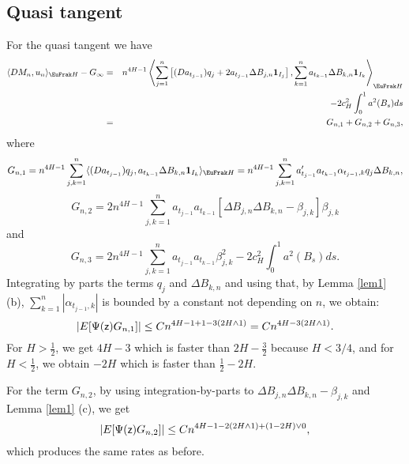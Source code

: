 \documentclass[a4paper]{article}
\newcommand{\colorb}{\color[rgb]{0,0,0.8}}
\newcommand{\colorb}{\color{black}}%
\numberwithin{equation}{section}
\newcommand{\sfz}{{\sf z}}
\def\HH{\EuFrak H}
\begin{document}
     \medskip
     \noindent
   \subsection{Quasi tangent}
     
     For the quasi tangent we have
     \begin{eqnarray*}
     \langle DM_n, u_n \rangle_{\HH} - G_\infty &=& n^{4H-1} \left  \langle    \sum_{j=1}^n  \left[( D a_{t_{j-1}}) q_j +   2  a_{t_{j-1}}  \Delta B_{j,n}   \mathbf{1}_{ I_j}  \right],
      \sum_{k=1}^n  a_{t_{k-1}} \Delta  B_{k,n}   \mathbf{1}_{ I_k}  \right  \rangle_{\HH}\\
      &&-  2c_H^2 \int_0^1 a^2 (B_s) ds\\
      &=& G_{n,1} + G_{n,2} + G_{n,3},
     \end{eqnarray*}
     where
     \[
     G_{n,1}= n^{4H-1}  \sum_{j,k=1}^n\langle   (D a_{t_{j-1}}) q_j , a_{t_{k-1}} \Delta  B_{k,n}   \mathbf{1}_{ I_k} \rangle_{\HH}
     =n^{4H-1}  \sum_{j,k=1}^n a'_{t_{j-1}}  a_{t_{k-1}} \alpha_{t_{j-1},k} q_j  \Delta  B_{k,n} ,
     \]
     \[
     G_{n,2}= 2n^{4H-1}  \sum_{j,k=1}^n  a_{t_{j-1}} a_{t_{k-1}} [\Delta B_{j,n}\Delta  B_{k,n}  -\beta_{j,k}] \beta_{j,k}
     \]
     and
     \[
      G_{n,3}= 2n^{4H-1}  \sum_{j,k=1}^n  a_{t_{j-1}} a_{t_{k-1}} \beta_{j,k}^2-2c_H^2 \int_0^1 a^2 (B_s) ds.
      \]
     Integrating by parts the terms $q_j$ and $ \Delta  B_{k,n} $ and using that, by Lemma \ref{lem1} (b),  $ \sum_{k=1}^n |\alpha_{t_{j-1},k} |$ is bounded by a constant not depending on $n$, we obtain:
       \[
   |E[ \Psi(\sfz)G_{n,1}] |\le  Cn^{4H-1+1-3(2H\wedge 1)} =  Cn^{4H-3(2H\wedge 1)} .
     \]
     For $H>\frac 12$, we get $4H-3$ which is faster than $2H-\frac 32$ 
     {\colorb because $H<3/4$}, and for $H<\frac 12$, we obtain $-2H$ which is faster than $\frac 12-2H$.
     
     For the term $G_{n,2}$, {\colorb by using integration-by-parts to $\Delta B_{j,n}\Delta  B_{k,n}  -\beta_{j,k}$ 
     and Lemma \ref{lem1} (c),} we get
     \[
        |E[ \Psi(\sfz)G_{n,2}] |\le  Cn^{4H-1-2(2H\wedge 1)+ (1-2H) \vee 0},
     \]
     which produces the same rates as before.
     
\end{document}
